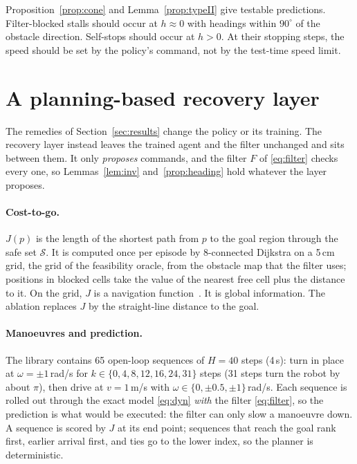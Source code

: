 \documentclass[11pt]{article}
\theoremstyle{definition}
\theoremstyle{remark}
\begin{document}
Proposition~\ref{prop:cone} and Lemma~\ref{prop:typeII} give testable predictions. Filter-blocked stalls should occur at $h\approx0$ with headings within $90^\circ$ of the obstacle direction. Self-stops should occur at $h>0$. At their stopping steps, the speed should be set by the policy's command, not by the test-time speed limit.

\section{A planning-based recovery layer}\label{sec:method}
The remedies of Section~\ref{sec:results} change the policy or its training. The recovery layer instead leaves the trained agent and the filter unchanged and sits between them. It only \emph{proposes} commands, and the filter $F$ of \eqref{eq:filter} checks every one, so Lemmas~\ref{lem:inv} and~\ref{prop:heading} hold whatever the layer proposes.

\paragraph{Cost-to-go.} $J(p)$ is the length of the shortest path from $p$ to the goal region through the safe set $\mathcal S$. It is computed once per episode by 8-connected Dijkstra on a 5\,cm grid, the grid of the feasibility oracle, from the obstacle map that the filter uses; positions in blocked cells take the value of the nearest free cell plus the distance to it. On the grid, $J$ is a navigation function~\cite{rimon1992navigation}. It is global information. The ablation replaces $J$ by the straight-line distance to the goal.

\paragraph{Manoeuvres and prediction.} The library contains 65 open-loop sequences of $H=40$ steps (4\,s): turn in place at $\omega=\pm1$\,rad/s for $k\in\{0,4,8,12,16,24,31\}$ steps (31 steps turn the robot by about $\pi$), then drive at $v=1$\,m/s with $\omega\in\{0,\pm0.5,\pm1\}$\,rad/s. Each sequence is rolled out through the exact model \eqref{eq:dyn} \emph{with} the filter \eqref{eq:filter}, so the prediction is what would be executed: the filter can only slow a manoeuvre down. A sequence is scored by $J$ at its end point; sequences that reach the goal rank first, earlier arrival first, and ties go to the lower index, so the planner is deterministic.
\end{document}
